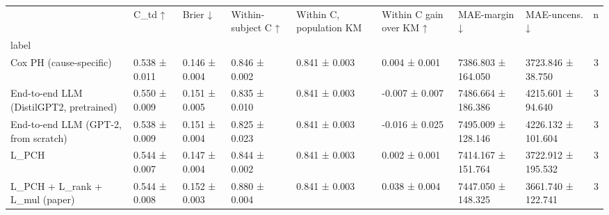 \begin{tabular}{llllllllr}
\toprule
 & C\_td ↑ & Brier ↓ & Within-subject C ↑ & Within C, population KM & Within C gain over KM ↑ & MAE-margin ↓ & MAE-uncens. ↓ & n \\
label &  &  &  &  &  &  &  &  \\
\midrule
Cox PH (cause-specific) & 0.538 ± 0.011 & 0.146 ± 0.004 & 0.846 ± 0.002 & 0.841 ± 0.003 & 0.004 ± 0.001 & 7386.803 ± 164.050 & 3723.846 ± 38.750 & 3 \\
End-to-end LLM (DistilGPT2, pretrained) & 0.550 ± 0.009 & 0.151 ± 0.005 & 0.835 ± 0.010 & 0.841 ± 0.003 & -0.007 ± 0.007 & 7486.664 ± 186.386 & 4215.601 ± 94.640 & 3 \\
End-to-end LLM (GPT-2, from scratch) & 0.538 ± 0.009 & 0.151 ± 0.004 & 0.825 ± 0.023 & 0.841 ± 0.003 & -0.016 ± 0.025 & 7495.009 ± 128.146 & 4226.132 ± 101.604 & 3 \\
L\_PCH & 0.544 ± 0.007 & 0.147 ± 0.004 & 0.844 ± 0.002 & 0.841 ± 0.003 & 0.002 ± 0.001 & 7414.167 ± 151.764 & 3722.912 ± 195.532 & 3 \\
L\_PCH + L\_rank + L\_mul (paper) & 0.544 ± 0.008 & 0.152 ± 0.003 & 0.880 ± 0.004 & 0.841 ± 0.003 & 0.038 ± 0.004 & 7447.050 ± 148.325 & 3661.740 ± 122.741 & 3 \\
\bottomrule
\end{tabular}

